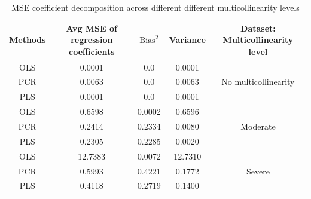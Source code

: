 \documentclass[11pt,twoside,a4paper]{article}
\begin{document}
\begin{table}[h]
    \centering
    \begin{tabular}{|c|c|c|c|c|}
        \hline
        Methods & Avg MSE of regression coefficients &  $\text{Bias}^2$ & Variance & Dataset: Multicollinearity level \\
        \hline
        OLS & 0.0001 & 0.0 & 0.0001 & \multirow{3}{*}{No multicollinearity} \\
        PCR & 0.0063 & 0.0 & 0.0063 &  \\
        PLS & 0.0001 & 0.0 & 0.0001 &  \\
        \hline
        OLS & 0.6598 & 0.0002 & 0.6596 & \multirow{3}{*}{Moderate} \\        
        PCR & 0.2414 & 0.2334 & 0.0080 &  \\
        PLS & 0.2305 & 0.2285 & 0.0020 &  \\
        \hline
        OLS & 12.7383 & 0.0072 & 12.7310 & \multirow{3}{*}{Severe} \\
        PCR & 0.5993 & 0.4221 & 0.1772 &  \\
        PLS & 0.4118 & 0.2719 & 0.1400 &  \\ 
        \hline
    \end{tabular}
    \caption{MSE coefficient decomposition across different different multicollinearity levels}
    \label{tab:Stability_analysis}
\end{table}
\newpage
\end{document}
